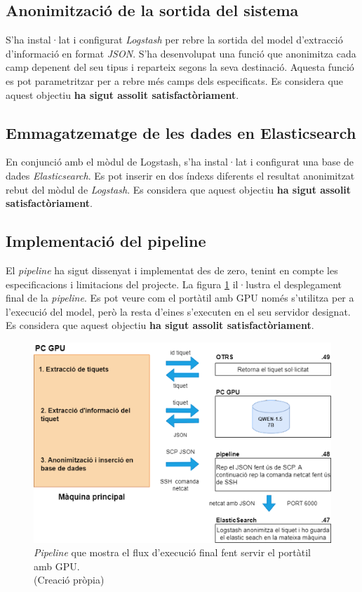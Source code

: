 \subsection{Anonimització de la sortida del sistema}
S'ha instal·lat i configurat \textit{Logstash} per rebre la sortida del model d'extracció d'informació en format \textit{JSON}. S'ha desenvolupat una funció que anonimitza cada camp depenent del seu tipus i reparteix segons la seva destinació. Aquesta funció es pot parametritzar per a rebre més camps dels especificats. Es considera que aquest objectiu \textbf{ha sigut assolit satisfactòriament}.

\subsection{Emmagatzematge de les dades en Elasticsearch}
En conjunció amb el mòdul de Logstash, s'ha instal·lat i configurat una base de dades \textit{Elasticsearch}. Es pot inserir en dos índexs diferents el resultat anonimitzat rebut del mòdul de \textit{Logstash}. Es considera que aquest objectiu \textbf{ha sigut assolit satisfactòriament}.

\subsection{Implementació del pipeline}
El \textit{pipeline} ha sigut dissenyat i implementat des de zero, tenint en compte les especificacions i limitacions del projecte. La figura \ref{fig:pipeline_flux_real} il·lustra el desplegament final de la \textit{pipeline}. Es pot veure com el portàtil amb GPU només s'utilitza per a l'execució del model, però la resta d'eines s'executen en el seu servidor designat. Es considera que aquest objectiu \textbf{ha sigut assolit satisfactòriament}.

\begin{figure}[H]
\centering
\includegraphics[width=\textwidth]{pipeline_flux_real.png}
\caption[\textit{Pipeline} mostra el flux d'execució final]{\textit{Pipeline} que mostra el flux d'execució final fent servir el portàtil amb GPU. \\ (Creació pròpia)}
\label{fig:pipeline_flux_real}
\end{figure}

